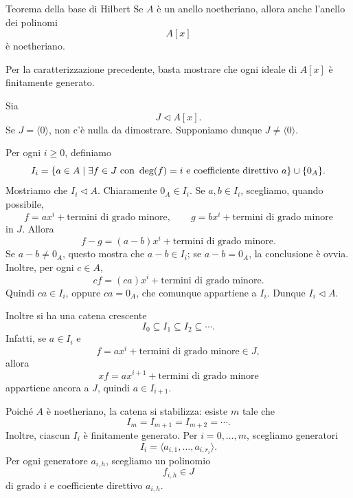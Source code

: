 \documentclass[a4paper]{article}
\begin{document}
\begin{radioactive}
\begin{snippettheorem}{Teorema della base di Hilbert}
    Se \(A\) è un anello noetheriano, allora anche l'anello dei polinomi
    \[
        A[x]
    \]
    è noetheriano.
\end{snippettheorem}
\end{radioactive}

\begin{radioactive}
\begin{snippetproof}{}
    Per la caratterizzazione precedente, basta mostrare che ogni ideale di \(A[x]\) è finitamente generato.

    Sia
    \[
        J\triangleleft A[x].
    \]
    Se \(J=\langle 0 \rangle\), non c'è nulla da dimostrare. Supponiamo dunque \(J\neq \langle 0 \rangle\).

    Per ogni \(i\geq 0\), definiamo
    \[
        I_i
        =
        \{a\in A\mid \exists f\in J \text{ con } \deg(f)=i
        \text{ e coefficiente direttivo } a\}
        \cup
        \{0_A\}.
    \]
    Mostriamo che \(I_i\triangleleft A\).
    Chiaramente \(0_A\in I_i\). Se \(a,b\in I_i\), scegliamo, quando possibile,
    \[
        f=a x^i+\text{termini di grado minore},
        \qquad
        g=b x^i+\text{termini di grado minore}
    \]
    in \(J\). Allora
    \[
        f-g=(a-b)x^i+\text{termini di grado minore}.
    \]
    Se \(a-b\neq 0_A\), questo mostra che \(a-b\in I_i\); se \(a-b=0_A\), la conclusione è ovvia. Inoltre, per ogni \(c\in A\),
    \[
        cf=(ca)x^i+\text{termini di grado minore}.
    \]
    Quindi \(ca\in I_i\), oppure \(ca=0_A\), che comunque appartiene a \(I_i\).
    Dunque \(I_i\triangleleft A\).

    Inoltre si ha una catena crescente
    \[
        I_0\subseteq I_1\subseteq I_2\subseteq\cdots.
    \]
    Infatti, se \(a\in I_i\) e
    \[
        f=a x^i+\text{termini di grado minore}\in J,
    \]
    allora
    \[
        xf=a x^{i+1}+\text{termini di grado minore}
    \]
    appartiene ancora a \(J\), quindi \(a\in I_{i+1}\).

    Poiché \(A\) è noetheriano, la catena si stabilizza: esiste \(m\) tale che
    \[
        I_m=I_{m+1}=I_{m+2}=\cdots.
    \]
    Inoltre, ciascun \(I_i\) è finitamente generato. Per \(i=0,\ldots,m\), scegliamo generatori
    \[
        I_i=\langle a_{i,1},\ldots,a_{i,r_i} \rangle.
    \]
    Per ogni generatore \(a_{i,h}\), scegliamo un polinomio
    \[
        f_{i,h}\in J
    \]
    di grado \(i\) e coefficiente direttivo \(a_{i,h}\).


\end{snippetproof}
\end{radioactive}
\end{document}
